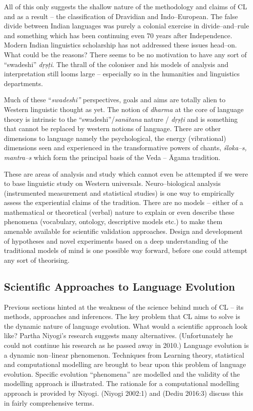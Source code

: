 All of this only suggests the shallow nature of the methodology and claims of CL and as a result – the classification of Dravidian and Indo–European. The false divide between Indian languages was purely a colonial exercise in divide–and–rule and something which has been continuing even 70 years after Independence. Modern Indian linguistics scholarship has not addressed these issues head–on. What could be the reasons? There seems to be no motivation to have any sort of “swadeshi” \textit{dṛṣṭi}. The thrall of the coloniser and his models of analysis and interpretation still looms large – especially so in the humanities and linguistics departments.

Much of these “\textit{swadeshi”} perspectives, goals and aims are totally alien to Western linguistic thought as yet. The notion of \textit{dharma} at the core of language theory is intrinsic to the “swadeshi”/\textit{sanātana} nature / \textit{dṛṣṭi} and is something that cannot be replaced by western notions of language. There are other dimensions to language namely the psychological, the energy (vibrational) dimensions seen and experienced in the transformative powers of chants, \textit{śloka–s, mantra–s} which form the principal basis of the Veda – Āgama tradition.

These are areas of analysis and study which cannot even be attempted if we were to base linguistic study on Western universals. Neuro–biological analysis (instrumented measurement and statistical studies) is one way to empirically assess the experiential claims of the tradition. There are no models – either of a mathematical or theoretical (verbal) nature to explain or even describe these phenomena (vocabulary, ontology, descriptive models etc.) to make them amenable available for scientific validation approaches. Design and development of hypotheses and novel experiments based on a deep understanding of the traditional models of mind is one possible way forward, before one could attempt any sort of theorising.


\subsection*{Scientific Approaches to Language Evolution}

Previous sections hinted at the weakness of the science behind much of CL – its methods, approaches and inferences. The key problem that CL aims to solve is the dynamic nature of language evolution. What would a scientific approach look like? Partha Niyogi’s research suggests many alternatives. (Unfortunately he could not continue his research as he passed away in 2010.) Language evolution is a dynamic non–linear phenomenon. Techniques from Learning theory, statistical and computational modelling are brought to bear upon this problem of language evolution. Specific evolution “phenomena” are modelled and the validity of the modelling approach is illustrated. The rationale for a computational modelling approach is provided by Niyogi. (Niyogi 2002:1) and (Dediu 2016:3) discuss this in fairly comprehensive terms.

